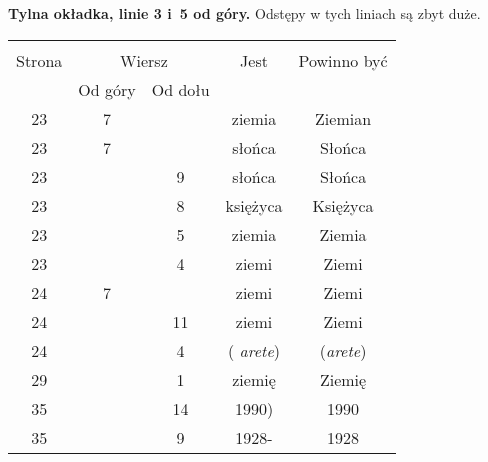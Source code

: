 \documentclass[a4paper,11pt]{article}
\begin{document}
\vspace{\spaceFour}





\start \textbf{Tylna okładka, linie 3 i~5 od góry.} Odstępy w tych
liniach są zbyt duże.





\newpage



\begin{center}

  \begin{tabular}{|c|c|c|c|c|}
    \hline
    & \multicolumn{2}{c|}{} & & \\
    Strona & \multicolumn{2}{c|}{Wiersz} & Jest
                              & Powinno być \\ \cline{2-3}
    & Od góry & Od dołu & & \\
    \hline
    23  &  7 & & ziemia & Ziemian \\
    23  &  7 & & słońca & Słońca \\
    23  & &  9 & słońca & Słońca \\
    23  & &  8 & księżyca & Księżyca \\
    23  & &  5 & ziemia & Ziemia \\
    23  & &  4 & ziemi & Ziemi \\
    24  &  7 & & ziemi & Ziemi \\
    24  & & 11 & ziemi & Ziemi \\
    24  & &  4 & ( \textit{arete}) & (\textit{arete}) \\
    29  & &  1 & ziemię & Ziemię \\
    35  & & 14 & 1990) & 1990 \\
    35  & &  9 & 1928- & 1928 \\
    \hline
  \end{tabular}

\end{center}

\vspace{\spaceTwo}
\end{document}

